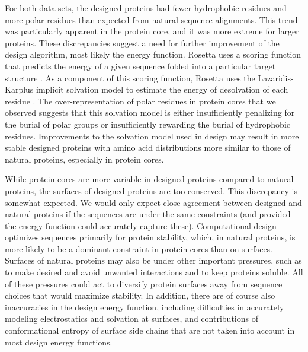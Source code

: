 \documentclass[12pt]{article}
\begin{document}
For both data sets, the designed proteins had fewer hydrophobic residues and more polar residues than expected from natural sequence alignments. This trend was particularly apparent in the protein core, and it was more extreme for larger proteins. These discrepancies suggest a need for further improvement of the design algorithm, most likely the energy function. Rosetta uses a scoring function that predicts the energy of a given sequence folded into a particular target structure \citep{Kuhlman2003}. As a component of this scoring function, Rosetta uses the Lazaridis-Karplus implicit solvation model to estimate the energy of desolvation of each residue \citep{Lazaridis1999}. The over-representation of polar residues in protein cores that we observed suggests that this solvation model is either insufficiently penalizing for the burial of polar groups or insufficiently rewarding the burial of hydrophobic residues. Improvements to the solvation model used in design may result in more stable designed proteins with amino acid distributions more similar to those of natural proteins, especially in protein cores.

While protein cores are more variable in designed proteins compared to natural proteins, the surfaces of designed proteins are too conserved. This discrepancy is somewhat expected. We would only expect close agreement between designed and natural proteins if the sequences are under the same constraints (and provided the energy function could accurately capture these). Computational design optimizes sequences primarily for protein stability, which, in natural proteins, is more likely to be a dominant constraint in protein cores than on surfaces. Surfaces of natural proteins may also be under other important pressures, such as to make desired and avoid unwanted interactions and to keep proteins soluble. All of these pressures could act to diversify protein surfaces away from sequence choices that would maximize stability. In addition, there are of course also inaccuracies in the design energy function, including difficulties in accurately modeling electrostatics and solvation at surfaces, and contributions of conformational entropy of surface side chains that are not taken into account in most design energy functions.
\end{document}
